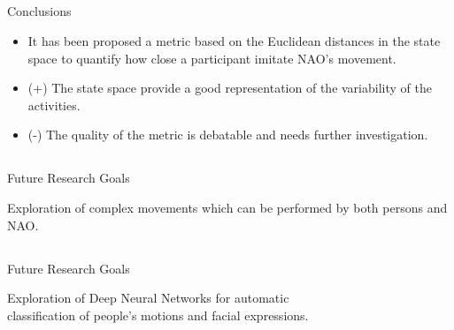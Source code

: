 \documentclass[compress]{beamer}
\begin{document}
\subsection{}
{
\begin{frame}{Conclusions}


          \begin{itemize}
              \item It has been proposed a metric based on the Euclidean distances
              in the state space to quantify how close a participant imitate NAO's movement.
              \item (+) The state space provide a good representation of the
              variability of the activities.
              \item (-) The quality of the metric is debatable and needs further
              investigation.
          \end{itemize}

\end{frame}
}

\subsection{}
{
\begin{frame}{Future Research Goals}

  Exploration of complex movements which can be performed by both
  persons and NAO.

          \begin{figure}
              \centering
          \end{figure}

\end{frame}
}


\subsection{}
{
\begin{frame}{Future Research Goals}

  Exploration of Deep Neural Networks for automatic \\
  classification of people's motions and facial expressions.

          \begin{figure}
              \centering
          \end{figure}

\end{frame}
}
\end{document}

